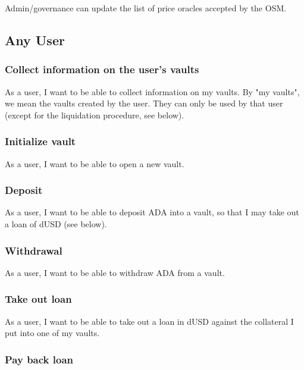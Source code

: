 \documentclass{article} %
\begin{document}
Admin/governance can update the list of price oracles accepted by the OSM.


\subsection{Any User}

\subsubsection{Collect information on the user's vaults}

As a user, I want to be able to collect information on my vaults. By "my
vaults", we mean the vaults created by the user. They can only be used by that
user (except for the liquidation procedure, see below).

\subsubsection{Initialize vault}

As a user, I want to be able to open a new vault.

\subsubsection{Deposit}

As a user, I want to be able to deposit ADA into a vault, so that I may take out
a loan of dUSD (see below).

\subsubsection{Withdrawal}

As a user, I want to be able to withdraw ADA from a vault.

\subsubsection{Take out loan}

As a user, I want to be able to take out a loan in dUSD against the collateral I
put into one of my vaults.

\subsubsection{Pay back loan}
\end{document}
